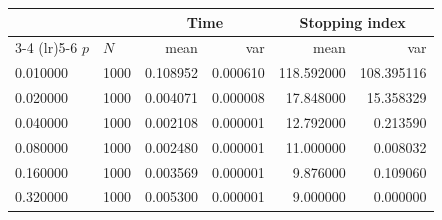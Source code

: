 \begin{tabular}{llrrrr}
      \toprule
      & & \multicolumn{2}{c}{Time} & \multicolumn{2}{c}{Stopping index} \\
      \cmidrule(lr){3-4} \cmidrule(lr){5-6}
      $p$ & $N$ & mean & var & mean & var \\
      \midrule
      0.010000 & 1000  & 0.108952 & 0.000610 & 118.592000 & 108.395116 \\
      0.020000 & 1000  & 0.004071 & 0.000008 & 17.848000 & 15.358329 \\
      0.040000 & 1000  & 0.002108 & 0.000001 & 12.792000 & 0.213590 \\
      0.080000 & 1000  & 0.002480 & 0.000001 & 11.000000 & 0.008032 \\
      0.160000 & 1000  & 0.003569 & 0.000001 & 9.876000 & 0.109060 \\
      0.320000 & 1000  & 0.005300 & 0.000001 & 9.000000 & 0.000000 \\
      \bottomrule
    \end{tabular}
